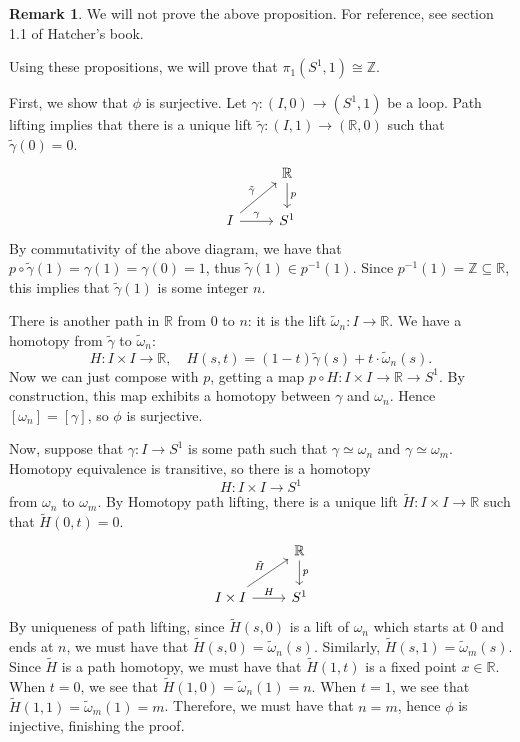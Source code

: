 \documentclass[10pt]{amsart}
\theoremstyle{definition}
\newtheorem{rmk}[thm]{Remark}
\newcommand{\cdef}[1]{\textcolor{Bittersweet}{#1}}
\begin{document}
\begin{rmk}
    We will not prove the above proposition. For reference, see section 1.1 of Hatcher's book.
\end{rmk}

Using these propositions, we will prove that $\pi_1(S^1, 1) \cong \mathbb{Z}$.

First, we show that $\phi$ is surjective.
Let $\gamma:(I, 0) \to (S^1, 1)$ be a loop. 
\cdef{Path lifting} implies that there is a unique lift $\tilde{\gamma}:(I, 1) \to (\mathbb{R}, 0)$ such that $\tilde{\gamma}(0) = 0$.
\[\begin{tikzcd}
	& {\mathbb{R}} \\
	I & {S^1}
	\arrow["p", from=1-2, to=2-2]
	\arrow["{\tilde{\gamma}}", from=2-1, to=1-2]
	\arrow["\gamma", from=2-1, to=2-2]
\end{tikzcd}\]
By commutativity of the above diagram, we have that $p \circ \tilde{\gamma}(1) = \gamma(1) = \gamma(0) = 1$, thus $\tilde{\gamma}(1) \in p^{-1}(1)$.
Since $p^{-1}(1) = \mathbb{Z} \subseteq \mathbb{R}$, this implies that $\tilde{\gamma}(1)$ is some integer $n$.

There is another path in $\mathbb{R}$ from $0$ to $n$: it is the lift $\tilde{\omega}_n:I \to \mathbb{R}$.
We have a homotopy from $\tilde{\gamma}$ to $\tilde{\omega}_n$:
\[
H:I \times I \to \mathbb{R}, \quad H(s,t) = (1-t)\tilde{\gamma}(s) + t \cdot \tilde{\omega}_n(s).
\]
Now we can just compose with $p$, getting a map $p \circ H:I \times I \to \mathbb{R} \to S^1$.
By construction, this map exhibits a homotopy between $\gamma$ and $\omega_n$.
Hence $[\omega_n] = [\gamma]$, so $\phi$ is surjective.

Now, suppose that $\gamma:I \to S^1$ is some path such that $\gamma \simeq \omega_n$ and $\gamma \simeq \omega_m$.
Homotopy equivalence is transitive, so there is a homotopy
\[
H:I \times I \to S^1
\]
from $\omega_n$ to $\omega_m$.
By \cdef{Homotopy path lifting}, there is a unique lift $\tilde{H}:I \times I \to \mathbb{R}$ such that $\tilde{H}(0, t)= 0$.
\[\begin{tikzcd}
	& {\mathbb{R}} \\
	{I \times I} & {S^1}
	\arrow["p", from=1-2, to=2-2]
	\arrow["{\tilde{H}}", from=2-1, to=1-2]
	\arrow["H", from=2-1, to=2-2]
\end{tikzcd}\]
By uniqueness of path lifting, since $\tilde{H}(s, 0)$ is a lift of $\omega_n$ which starts at 0 and ends at $n$, we must have that $\tilde{H}(s, 0) = \tilde{\omega}_n(s)$.
Similarly, $\tilde{H}(s, 1) = \tilde{\omega}_m(s)$.
Since $\tilde{H}$ is a path homotopy, we must have that $\tilde{H}(1, t)$ is a fixed point $x \in \mathbb{R}$.
When $t=0$, we see that $\tilde{H}(1, 0) = \tilde{\omega}_n(1) = n$.
When $t=1$, we see that $\tilde{H}(1,1) = \tilde{\omega}_m(1) = m$.
Therefore, we must have that $n=m$, hence $\phi$ is injective, finishing the proof.
\end{document}
